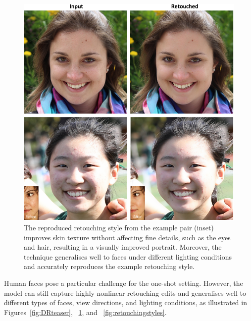 \begin{figure}[th] %
    \centering
	\includegraphics[width=0.8\columnwidth]{Chapters/detail-retouching-figs/res_diff_light_2_cvmp.pdf}
    \caption{\label{fig:newdataset_ex}The reproduced retouching style from the example pair (inset) improves skin texture without affecting fine details, such as the eyes and hair, resulting in a visually improved portrait. Moreover, the technique generalises well to faces under different lighting conditions and accurately reproduces the example retouching style.}
 
\end{figure}
Human faces pose a particular challenge for the one-shot setting. However, the model can still capture highly nonlinear retouching edits and generalises well to different types of faces, view directions, and lighting conditions, as illustrated in Figures~\ref{fig:DRteaser}, ~\ref{fig:newdataset_ex}, and ~\ref{fig:retouchingstyles}.

